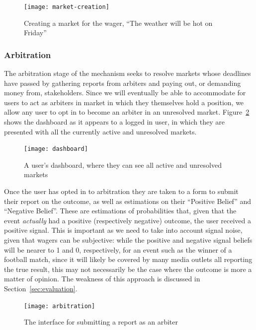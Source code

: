 \documentclass[10pt,a4paper]{article}
\theoremstyle{plain}
\theoremstyle{definition}
\begin{document}
\begin{figure}[h]
	\centering
	\texttt{[image: market-creation]}
	\caption{Creating a market for the wager, ``The weather will be hot on
	Friday''}
	\label{fig:marketCreation}
\end{figure}

\subsubsection{Arbitration}

\label{sec:arbitration}

The arbitration stage of the mechanism seeks to resolve markets whose deadlines
have passed by gathering reports from arbiters and paying out, or demanding
money from, stakeholders. Since we will eventually be able to accommodate for
users to act as arbiters in market in which they themselves hold a position, we
allow any user to opt in to become an arbiter in an unresolved market.
Figure~\ref{fig:dashboard} shows the dashboard as it appears to a logged in
user, in which they are presented with all the currently active and unresolved
markets. 

\begin{figure}[h]
	\centering
	\texttt{[image: dashboard]}
	\caption{A user's dashboard, where they can see all active and unresolved
	markets}
	\label{fig:dashboard}
\end{figure}

Once the user has opted in to arbitration they are taken to a form to submit
their report on the outcome, as well as estimations on their ``Positive
Belief'' and ``Negative Belief''. These are estimations of probabilities that,
given that the event \emph{actually} had a positive (respectively negative)
outcome, the user received a positive signal. This is important as we need to
take into account signal noise, given that wagers can be subjective: while the
positive and negative signal beliefs will be nearer to 1 and 0, respectively,
for an event such as the winner of a football match, since it will likely be
covered by many media outlets all reporting the true result, this may not
necessarily be the case where the outcome is more a matter of opinion. The
weakness of this approach is discussed in Section~\ref{sec:evaluation}.

\begin{figure}[h]
	\centering
	\texttt{[image: arbitration]}
	\caption{The interface for submitting a report as an arbiter}
	\label{fig:resolveSecurity}
\end{figure}
\end{document}
